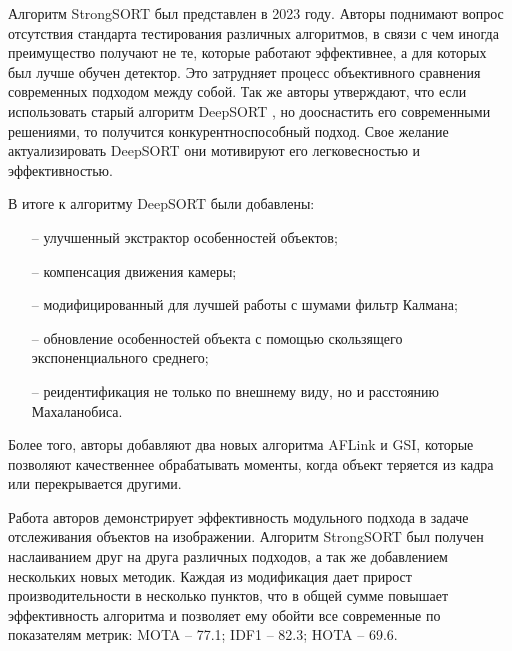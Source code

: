 Алгоритм StrongSORT \cite{du2023strongsort} был представлен в 2023 году. 
Авторы поднимают вопрос отсутствия стандарта тестирования различных алгоритмов, в связи с чем иногда преимущество получают не те, 
которые работают эффективнее, а для которых был лучше обучен детектор.
Это затрудняет процесс объективного сравнения современных подходом между собой. 
Так же авторы утверждают, что если использовать старый алгоритм DeepSORT \cite{wojke2017deepsort}, но дооснастить его современными решениями, то получится конкурентноспособный подход. Свое желание актуализировать DeepSORT они мотивируют его легковесностью и эффективностью.

В итоге к алгоритму DeepSORT были добавлены:
\begin{itemize}
    \item[--] улучшенный экстрактор особенностей объектов;
    \item[--] компенсация движения камеры;
    \item[--] модифицированный для лучшей работы с шумами фильтр Калмана;
    \item[--] обновление особенностей объекта с помощью скользящего экспоненциального среднего;
    \item[--] реидентификация не только по внешнему виду, но и расстоянию Махаланобиса.
\end{itemize}
Более того, авторы добавляют два новых алгоритма AFLink и GSI, которые позволяют качественнее обрабатывать моменты, когда объект теряется из кадра или перекрывается другими. 

Работа авторов демонстрирует эффективность модульного подхода в задаче отслеживания объектов на изображении. Алгоритм StrongSORT был получен наслаиванием друг на друга различных подходов, а так же добавлением нескольких новых методик.
Каждая из модификация дает прирост производительности в несколько пунктов, что в общей сумме повышает эффективность алгоритма и позволяет ему обойти все современные по показателям метрик: MOTA -- 77.1; IDF1 -- 82.3; HOTA -- 69.6.
